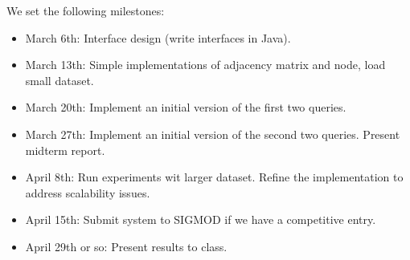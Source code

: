 \documentclass{article}
\begin{document}
\newpage

We set the following milestones:

\begin{itemize}
\item March 6th: Interface design (write interfaces in Java).
\item March 13th: Simple implementations of adjacency matrix and node, load small dataset.
\item March 20th: Implement an initial version of the first two queries.
\item March 27th: Implement an initial version of the second two queries. Present midterm report.
\item April 8th: Run experiments wit larger dataset. Refine the implementation to address scalability issues.
\item April 15th: Submit system to SIGMOD if we have a competitive entry.
\item April 29th or so: Present results to class.
\end{itemize}



\end{document}
